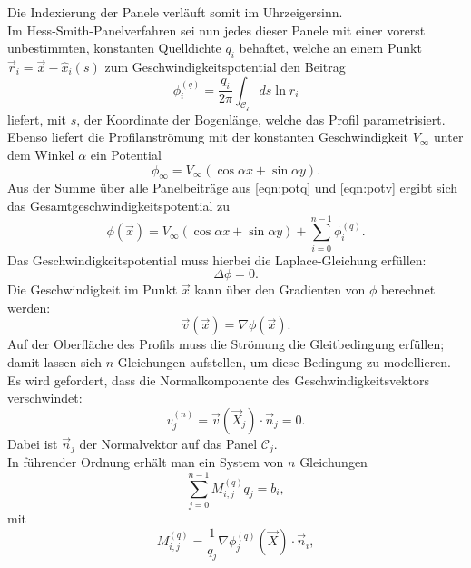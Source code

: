 Die Indexierung der Panele verläuft somit im Uhrzeigersinn. \\
Im Hess-Smith-Panelverfahren sei nun jedes dieser Panele mit einer vorerst unbestimmten, konstanten Quelldichte $q_i$ behaftet, welche an einem Punkt $\vec r_i =  \vec x - \hat x_i(s)$ zum Geschwindigkeitspotential den Beitrag
\begin{equation}
\label{eqn:potq}
\phi_i^{(q)} =  \frac{q_i}{2 \pi } \int_{\mathcal{C_i}} ds \ln r_i
\end{equation}
liefert, mit $s$, der Koordinate der Bogenlänge, welche das Profil parametrisiert. \\
Ebenso liefert die Profilanströmung mit der konstanten Geschwindigkeit $V_{\infty}$ unter dem Winkel $\alpha $ ein Potential
\begin{equation}
\label{eqn:potv}
\phi_{\infty} =  V_{\infty} (\cos{\alpha} x + \sin{\alpha} y).
\end{equation}
Aus der Summe über alle Panelbeiträge aus \eqref{eqn:potq} und \eqref{eqn:potv} ergibt sich das Gesamtgeschwindigkeitspotential zu
\begin{equation}
\label{eqn:potnovortex}
\phi(\vec x) =  V_{\infty} (\cos{\alpha} x + \sin{\alpha} y) + \sum_{i=0}^{n-1} \phi_i^{(q)}.
\end{equation}
Das Geschwindigkeitspotential muss hierbei die Laplace-Gleichung erfüllen:
\begin{equation}
\label{eqn:laplace}
\Delta \phi = 0.
\end{equation}
Die Geschwindigkeit im Punkt $\vec x$  kann über den Gradienten von $\phi$ berechnet werden:
\begin{equation}
\vec v ( \vec x) =  \nabla  \phi (\vec x).
\end{equation}
Auf der Oberfläche des Profils muss die Strömung die Gleitbedingung erfüllen; damit lassen sich $n$ Gleichungen aufstellen, um diese Bedingung zu modellieren. Es wird gefordert, dass die Normalkomponente des Geschwindigkeitsvektors verschwindet:
\begin{equation}
v_j^{(n)} =  \vec v(\vec X_j) \cdot \vec n_j = 0.
\end{equation}
Dabei ist $\vec n_j$ der Normalvektor auf das Panel $\mathcal{C}_j$.\\
In führender Ordnung erhält man ein System von $n$ Gleichungen
\begin{equation}
\label{eq:lgls1}
\sum_{j=0}^{n-1} M_{i,j}^{(q)}q_j =  b_i,
\end{equation}
mit
\begin{equation}
M_{i,j}^{(q)} = \frac{1}{q_j} \nabla \phi_j^{(q)} (\vec X) \cdot \vec n_i,
\end{equation}
